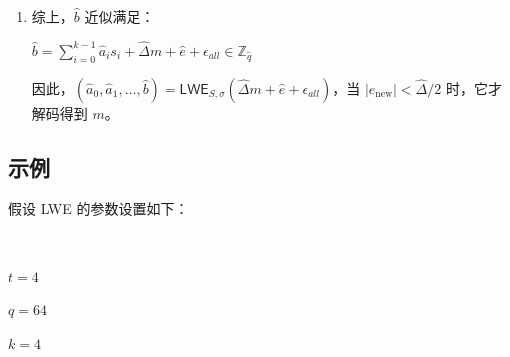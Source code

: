 \begin{myproof}
\begin{enumerate}
$= \sum\limits_{i=0}^{k-1}\hat{a}_is_i + \hat{\Delta} m + \left( \hat{e} - \epsilon_e + \epsilon_b - \sum\limits_{i=0}^{k-1}\epsilon_{a_i}s_i \right) \in \mathbb{Z}_{\hat{q}}$

$= \sum\limits_{i=0}^{k-1}\hat{a}_is_i + \hat{\Delta} m + \hat{e} + \epsilon_{\textit{all}} \in \mathbb{Z}_{\hat{q}}$ \textcolor{red}{ $\rhd$ 其中 $\epsilon_{\textit{all}} = \left(- \epsilon_e + \epsilon_b - \sum\limits_{i=0}^{k-1}\epsilon_{a_i}s_i \right)$}

$ $

这个辅助误差具有确定性上界
\[
|\epsilon_{\textit{all}}|\le1+\tfrac12\|\vec s\|_1\le1+\tfrac{k}{2}
\]
其中最后一步适用于二元或三元秘密。它是上界，而非实际误差值。解码必须去除的总误差为
\[
e_{\mathrm{new}}=\hat e+\epsilon_{\textit{all}}=re+\epsilon_b-\sum_i\epsilon_{a_i}s_i,
\qquad |e_{\mathrm{new}}|\le r|e|+\tfrac12(1+\|\vec s\|_1).
\]
要求这一上界小于 $\hat\Delta/2$，即可保证正确解码。这些项不一定独立或零均值，因为 $b$ 依赖掩码。增大 $k$ 本身不会使误差变小。

仅约束 $\epsilon_{\textit{all}}$ 并不充分，还须计入缩放后的输入误差。纯粹的精确缩放保持比值 $|e|/\Delta$ 不变；额外的舍入误差才可能耗尽缩小后的输出预算。

$ $

\item 综上，$\hat{b}$ 近似满足：

$\hat{b} = \sum\limits_{i=0}^{k-1}\hat{a}_is_i + \hat{\Delta} m + \hat{e} + \epsilon_{\textit{all}} \in \mathbb{Z}_{\hat{q}}$

因此，$(\hat{a}_0, \hat{a}_1, \ldots, \hat{b}) = \textsf{LWE}_{{S},\sigma}(\hat{\Delta} m + \hat{e} + \epsilon_{\textit{all}})$，当 $|e_{\mathrm{new}}|<\hat\Delta/2$ 时，它才解码得到 $m$。


\end{enumerate}
\end{myproof}

\subsection{示例}

假设 LWE 的参数设置如下：

$ $

$t = 4$

$q = 64$

$k = 4$


